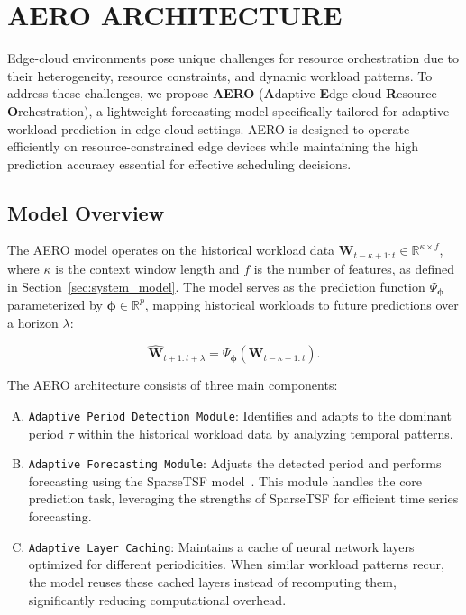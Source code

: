 \documentclass{ieeetmlcn}
\begin{document}
\section{AERO ARCHITECTURE}
\label{sec:proposed_solution}

{\color{blue}
Edge-cloud environments pose unique challenges for resource orchestration due to their heterogeneity, resource constraints, and dynamic workload patterns. To address these challenges, we propose \textbf{AERO} (\textbf{A}daptive \textbf{E}dge-cloud \textbf{R}esource \textbf{O}rchestration), a lightweight forecasting model specifically tailored for adaptive workload prediction in edge-cloud settings. AERO is designed to operate efficiently on resource-constrained edge devices while maintaining the high prediction accuracy essential for effective scheduling decisions.
}

\subsection*{Model Overview}


The AERO model operates on the historical workload data $\mathbf{W}_{t-\kappa+1:t} \in \mathbb{R}^{\kappa \times f}$, where $\kappa$ is the context window length and $f$ is the number of features, as defined in Section~\ref{sec:system_model}. The model serves as the prediction function $\Psi_{\boldsymbol{\phi}}$ parameterized by $\boldsymbol{\phi} \in \mathbb{R}^p$, mapping historical workloads to future predictions over a horizon $\lambda$:

\begin{equation}
\label{eq:aero_prediction_function}
\hat{\mathbf{W}}_{t+1:t+\lambda} = \Psi_{\boldsymbol{\phi}}\left( \mathbf{W}_{t-\kappa+1:t} \right).
\end{equation}

The AERO architecture consists of three main components:
\begin{enumerate}[A.]
    \item \texttt{Adaptive Period Detection Module}: Identifies and adapts to the dominant period $\tau$ within the historical workload data by analyzing temporal patterns.

    \item \texttt{Adaptive Forecasting Module}: Adjusts the detected period and performs forecasting using the SparseTSF model~\cite{sparseTSF}. This module handles the core prediction task, leveraging the strengths of SparseTSF for efficient time series forecasting.

    \item \texttt{Adaptive Layer Caching}: Maintains a cache of neural network layers optimized for different periodicities. When similar workload patterns recur, the model reuses these cached layers instead of recomputing them, significantly reducing computational overhead.
\end{enumerate}
\end{document}
